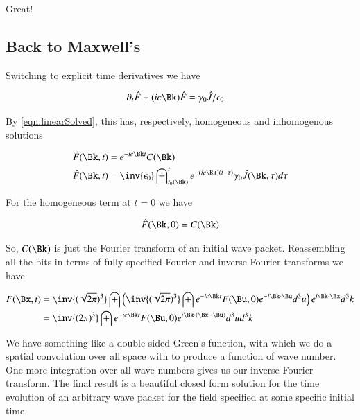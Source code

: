 \documentclass{article}
\begin{document}
Great!

\subsection{ Back to Maxwell's }

Switching to explicit time derivatives we have

\begin{align*}
\partial_t \hat{F} + (i c \Bk) \hat{F} &= \gamma_0 \hat{J}/ \epsilon_0
\end{align*}

By \ref{eqn:linearSolved}, this has, respectively, homogeneous and inhomogenous solutions 

\begin{align}\label{eqn:waveNumberDomain}
\hat{F}(\Bk,t) &= e^{-i c \Bk t} C(\Bk) \\
\hat{F}(\Bk,t) &= \inv{\epsilon_0} \int_{t_0(\Bk)}^{t} e^{-(i c \Bk) (t -\tau)} \gamma_0 \hat{J}(\Bk,\tau) d\tau 
\end{align}

For the homogeneous term at $t=0$ we have

\begin{align*}
\hat{F}(\Bk,0) &= C(\Bk) \\
\end{align*}

So, $C(\Bk)$ is just the Fourier transform of an initial wave packet.  Reassembling all the bits in terms of fully specified Fourier and inverse Fourier transforms we have

\begin{align*}
F(\Bx,t) 
&=
\inv{(\sqrt{2\pi})^3} \int 
\left(
\inv{(\sqrt{2\pi})^3} \int e^{-ic \Bk t} F(\Bu,0) e^{-i \Bk \cdot \Bu} d^3 u
\right)
e^{i \Bk \cdot \Bx} d^3 k \\
&= \inv{({2\pi})^3} \int e^{-ic \Bk t} F(\Bu,0) e^{i \Bk \cdot (\Bx - \Bu)} d^3 u d^3 k \\
\end{align*}

We have something like a double sided Green's function, with which we do a spatial convolution over all space with to produce a function of wave number.  One more integration over all wave numbers gives us our inverse Fourier transform.  The final result is a beautiful closed form solution for the time evolution of an arbitrary wave packet for the field specified at some 
specific initial time.
\end{document}
